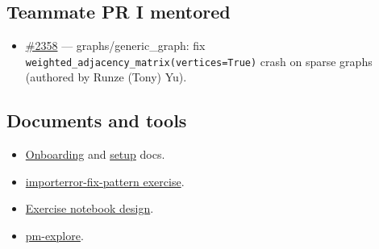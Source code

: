\documentclass[10pt]{article}
\begin{document}
\subsection*{Teammate PR I mentored}
\begin{itemize}
  \item \href{https://github.com/passagemath/passagemath/pull/2358}{\#2358} --- graphs/generic\_graph: fix \texttt{weighted\_adjacency\_matrix(vertices=True)} crash on sparse graphs (authored by Runze (Tony) Yu).
\end{itemize}

\subsection*{Documents and tools}
\begin{itemize}
  \item \href{https://github.com/sacchen/passagemath-workspace/blob/main/onboarding.md}{Onboarding} and \href{https://github.com/sacchen/passagemath-workspace/blob/main/setup.md}{setup} docs.
  \item \href{https://github.com/sacchen/passagemath-workspace/blob/main/exercises/importerror-fix-pattern/importerror-fix-pattern.ipynb}{importerror-fix-pattern exercise}.
  \item \href{https://github.com/sacchen/passagemath-workspace/blob/main/exercises/DESIGN.md}{Exercise notebook design}.
  \item \href{https://github.com/sacchen/passagemath-workspace/tree/main/tools/pm-explore}{pm-explore}.
\end{itemize}
\end{document}

